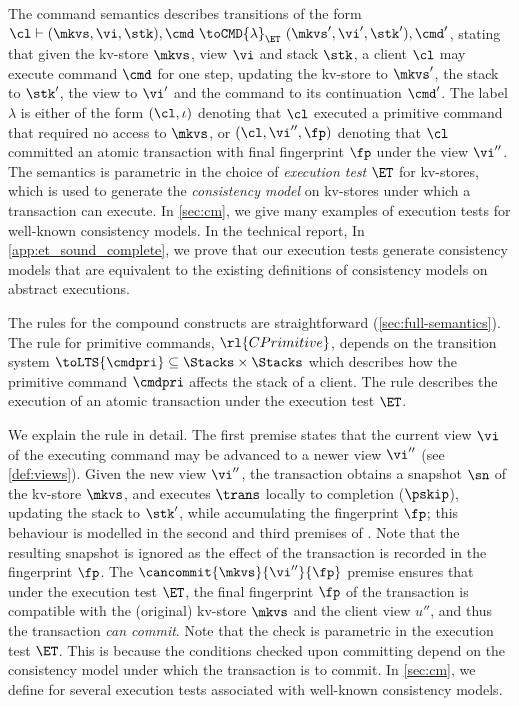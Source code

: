 %
The command semantics describes transitions of the form
\(\cl \vdash (\mkvs, \vi, \stk), \cmd \ \toCMD{\lambda}_{\ET} \ (\mkvs', \vi', \stk'), \cmd'\),
stating that given the kv-store \(\mkvs\), view \(\vi\) and stack \(\stk\), 
a client \(\cl\) may execute command \(\cmd\) for one step, updating 
the kv-store to \(\mkvs'\), the stack to \(\stk'\), the view to \( \vi' \) and the command to its continuation \(\cmd'\).
The label \(\lambda\) is either of the form \((\cl, \iota)\) denoting that \(\cl\) executed a primitive command
that required no access to \(\mkvs\), 
or \((\cl, \vi'', \fp)\) denoting that \(\cl\) committed an atomic transaction with final fingerprint \(\fp\) under the view \(\vi''\).
The semantics is parametric in the choice of \emph{execution test}
\(\ET\) for kv-stores, which is used to generate 
the \emph{consistency model} on kv-stores
under which a 
transaction can execute.
In \cref{sec:cm}, we give many examples of execution tests for
well-known consistency models.
\ifTechRepEdits%
In the technical report,
\else%
In \cref{app:et_sound_complete},
\fi
we prove that our execution tests 
generate consistency models that are equivalent to the existing definitions of
consistency models on abstract executions. 

The rules for the compound constructs are straightforward (\cref{sec:full-semantics}).
The rule for primitive commands, \(\rl{CPrimitive}\), 
depends on the 
transition system \(\toLTS{\cmdpri} \subseteq \Stacks \times \Stacks\) 
which describes how the primitive command \(\cmdpri\) affects the stack of a client.
The rule   describes the execution of an atomic 
transaction under the execution test \(\ET\). 


We explain the  rule in detail. 
The first premise 
states that the current view \(\vi\) of the executing command may be advanced to a newer  view \(\vi''\) (see \cref{def:views}). 
Given the new view \(\vi''\), the transaction obtains a snapshot \(\sn\) of the kv-store \(\mkvs\), 
and executes \(\trans\) locally to completion (\(\pskip\)), updating the stack to \(\stk'\), while accumulating the fingerprint \(\fp\); 
this behaviour  is modelled in the second and third premises of .
Note that the resulting snapshot is ignored 
as the effect of the transaction is recorded in the fingerprint \(\fp\). 
The \(\cancommit{\mkvs}{\vi''}{\fp}\) premise ensures that under the execution test \(\ET\), 
the final fingerprint \(\fp\) of the transaction is compatible with the (original) kv-store
\(\mkvs\) and the client view \(u''\), and thus the transaction \emph{can commit}. 
Note that the \cancommitname check is parametric in the execution test \(\ET\).
This is because the conditions checked upon committing depend on the consistency model under which the transaction is to commit. 
In \cref{sec:cm}, we define \cancommitname for several execution tests associated with well-known consistency models.


